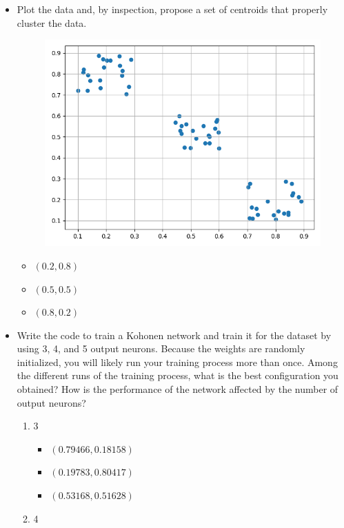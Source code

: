 \documentclass{article}
\begin{document}
\begin{itemize}
    \item Plot the data and, by inspection, propose a set of centroids that properly cluster the data.
    \begin{figure}[ht]
        \includegraphics[]{graph.png}        
    \end{figure}
    \begin{itemize}
        \item $(0.2, 0.8)$
        \item $(0.5, 0.5)$
        \item $(0.8, 0.2)$
    \end{itemize}
    \item Write the code to train a Kohonen network and train it for the dataset by using 3, 4, and 5 output neurons. Because the weights are randomly initialized, you will likely run your training process more than once. Among the different runs of the training process, what is the best configuration you obtained? How is the performance of the network affected by the number of output neurons?
    \begin{enumerate}
        \item 3
        \begin{itemize}
            \item $(0.79466, 0.18158)$
            \item $(0.19783, 0.80417)$
            \item $(0.53168, 0.51628)$
        \end{itemize}
        \item 4
        \begin{itemize}

\end{itemize}
\end{enumerate}
\end{itemize}
\end{document}
